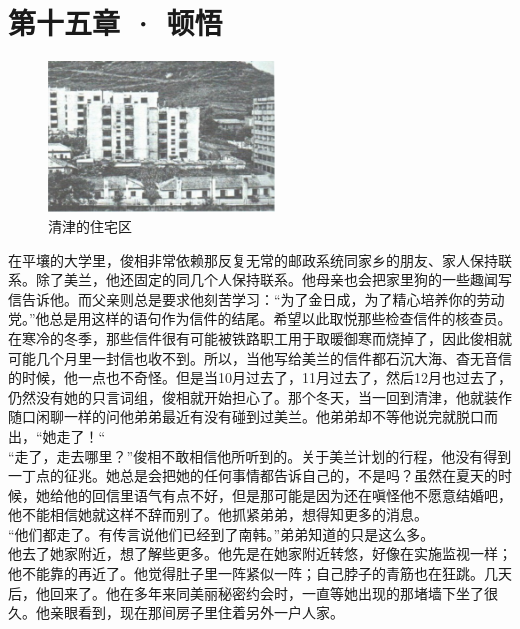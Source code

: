 \fancyhead[RO]{\thepage}
\fancyhead[LE]{\thepage}
\fancyfoot[LE,RO]{}
\fancyfoot[LO,CE]{}
\fancyfoot[CO,RE]{}
\chapter*{第十五章 · 顿悟}
\begin{figure}[!htbp]
\centering
\includegraphics[width=6cm]{./Chapters/Images/15.jpg}
\caption*{清津的住宅区}
\end{figure}

在平壤的大学里，俊相非常依赖那反复无常的邮政系统同家乡的朋友、家人保持联系。除了美兰，他还固定的同几个人保持联系。他母亲也会把家里狗的一些趣闻写信告诉他。而父亲则总是要求他刻苦学习：“为了金日成，为了精心培养你的劳动党。”他总是用这样的语句作为信件的结尾。希望以此取悦那些检查信件的核查员。在寒冷的冬季，那些信件很有可能被铁路职工用于取暖御寒而烧掉了，因此俊相就可能几个月里一封信也收不到。所以，当他写给美兰的信件都石沉大海、杳无音信的时候，他一点也不奇怪。但是当10月过去了，11月过去了，然后12月也过去了，仍然没有她的只言词组，俊相就开始担心了。那个冬天，当一回到清津，他就装作随口闲聊一样的问他弟弟最近有没有碰到过美兰。他弟弟却不等他说完就脱口而出，“她走了！“\\

“走了，走去哪里？”俊相不敢相信他所听到的。关于美兰计划的行程，他没有得到一丁点的征兆。她总是会把她的任何事情都告诉自己的，不是吗？虽然在夏天的时候，她给他的回信里语气有点不好，但是那可能是因为还在嗔怪他不愿意结婚吧，他不能相信她就这样不辞而别了。他抓紧弟弟，想得知更多的消息。\\

“他们都走了。有传言说他们已经到了南韩。”弟弟知道的只是这么多。\\

他去了她家附近，想了解些更多。他先是在她家附近转悠，好像在实施监视一样；他不能靠的再近了。他觉得肚子里一阵紧似一阵；自己脖子的青筋也在狂跳。几天后，他回来了。他在多年来同美丽秘密约会时，一直等她出现的那堵墙下坐了很久。他亲眼看到，现在那间房子里住着另外一户人家。\\


